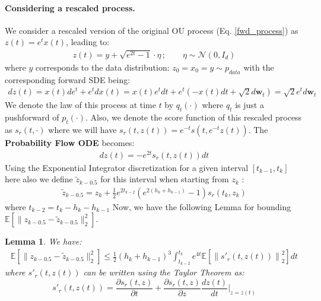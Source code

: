 \documentclass{article}
\def\vw{{\bm{w}}}
\newtheorem{lemma}{Lemma}[section]
\begin{document}
\paragraph{Considering a rescaled process.} %
\noindent
We consider a rescaled version of the original OU process (Eq. \ref{fwd_process}) as $z(t) = e^tx(t)$, leading to:
\begin{align}
\label{fwd_rescaled}
    z(t) = y+ \sqrt{e^{2t}-1} \cdot \eta \, ; \qquad \eta \sim \mathcal{N}(0,I_d) 
\end{align}
where $y$ corresponds to the data distribution: $z_0=x_0=y\sim p_{data}$ with the corresponding forward SDE being:
\begin{align*}
    dz(t) = x(t)de^{t} + e^tdx(t) = x(t)e^tdt + e^{t}\left(-x(t)dt + \sqrt{2}d\vw_t\right) = \sqrt{2}e^td\vw_t
\end{align*}
{We denote the law of this process at time $t$ by $q_t(\cdot)$ where $q_t$  is just a pushforward of $p_t(\cdot)$. Also, we denote the score function of this rescaled process as $s_r(t,\cdot)$ where we will have $s_r(t,z(t)) = e^{-t}s(t,e^{-t}z(t))$}.
 The \textbf{Probability Flow ODE} becomes:
\begin{align}
\label{rescaled_back_ode}
    dz(t) = -e^{2t}s_r(t,z(t))dt
\end{align}
Using the Exponential Integrator discretization for a given interval $[t_{k-1},t_k]$ here also we define $\tilde{z}_{k-0.5}$ for this interval when starting from $z_k$ :
\begin{align}
\label{rescaled_discretized_ode_process}
    \tilde{z}_{k-0.5} = {z_k} + \frac{1}{2}e^{2t_{k-2}}({e^{2(h_k+h_{k-1})}-1})s_r(t_k,z_k) 
\end{align}
where $t_{k-2}=t_{k}-h_k-h_{k-1}$
\noindent
Now, we have the following Lemma for bounding $\mathbb{E}\left[\|z_{k-0.5}-\tilde{z}_{k-0.5}\|_2^2\right]$.

\begin{lemma}
\label{discretization_error_rescaled}
    We have:
    \begin{align*}
        \mathbb{E}\left[\|z_{k-0.5}-\tilde{z}_{k-0.5}\|_2^2\right]  \leq \frac{1}{2}(h_k+h_{k-1})^3  \int_{t_{k-2}}^{t_k}e^{4t}\mathbb{E}\left[\left\|s'_r(t,z(t)) \right\|_2^2\right]dt
    \end{align*}
    where $s'_r(t,z(t))$ can be written using the Taylor Theorem as:
\[
s'_r(t,z(t))= {\frac{\partial s_r(t,z)}{\partial t}}
+ {{\frac{\partial s_r(t,z)}{\partial z}} {\frac{d z(t)}{d t}} \Big|_{z=z(t)}}
\]
\end{lemma}
\end{document}
